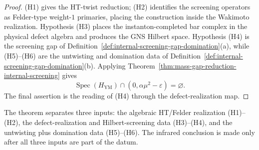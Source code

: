 \begin{proof}
(H1) gives the HT-twist reduction; (H2) identifies the screening
operators as Felder-type weight-$1$ primaries, placing the
construction inside the Wakimoto realization. Hypothesis (H3) places
the instanton-completed bar complex in the physical defect algebra and
produces the GNS Hilbert space. Hypothesis (H4) is the screening gap
of Definition~\ref{def:internal-screening-gap-domination}(a), while
(H5)--(H6) are the untwisting and domination data of
Definition~\ref{def:internal-screening-gap-domination}(b). Applying
Theorem~\ref{thm:mass-gap-reduction-internal-screening} gives
\[
\operatorname{Spec}(H_{\mathrm{YM}})
\cap(0,\alpha\mu^2-\varepsilon)=\varnothing.
\]
The final assertion is the reading of (H4) through the
defect-realization map.
\end{proof}

\begin{remark}
\label{rem:mass-gap-bridge-data}
The theorem separates three inputs: the algebraic HT/Felder
realization (H1)--(H2), the defect-realization and Hilbert-screening
data (H3)--(H4), and the untwisting plus domination data (H5)--(H6).
The infrared conclusion is made only after all three inputs are part
of the datum.
\end{remark}
